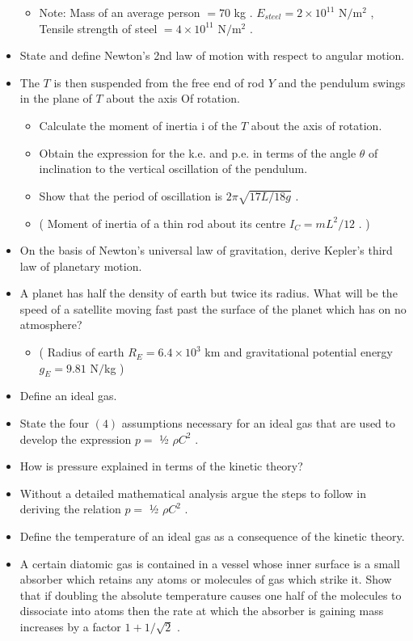 \documentclass{article}
\begin{document}
\begin{itemize}
\begin{itemize}
\item Note: Mass of an average person $ =70$ kg . $ E_{steel}=2 \times 10^{11}$ N$/$m$^{2}$ , Tensile strength of steel $ =4 \times 10^{11}$ N$/$m$^{2}$ .
\end{itemize}
\item State and define Newton’s 2nd law of motion with respect to angular motion. 
\item The $ T$ is then suspended from the free end of rod $ Y$ and the pendulum swings in the plane of $ T$ about the axis Of rotation.
 \begin{itemize}
\item Calculate the moment of inertia i of the $ T$ about the axis of rotation. 
\item Obtain the expression for the k.e. and p.e. in terms of the angle $ \theta $ of inclination to the vertical oscillation of the pendulum. 
\item Show that the period of oscillation is $ 2\pi\sqrt{17L/18g}$ . 
\item ( Moment of inertia of a thin rod about its centre $ I_{C}=mL^{2}/12$ . )
\end{itemize}
\item On the basis of Newton’s universal law of gravitation, derive Kepler’s third law of planetary motion. 
\item A planet has half the density of earth but twice its radius. What will be the speed of a satellite moving fast past the surface of the planet which has on no atmosphere?
 \begin{itemize}
\item ( Radius of earth $ R_{E}=6.4 \times 10^{3}$ km and gravitational potential energy $ g_{E}=9.81$ N$/$kg )
\end{itemize}
\item Define an ideal gas.
\item State the four $ (4)$ assumptions necessary for an ideal gas that are used to develop the expression $ p=$ ½ $ \rho C^{2}$ .
\item How is pressure explained in terms of the kinetic theory? 
\item Without a detailed mathematical analysis argue the steps to follow in deriving the relation $ p=$ ½ $ \rho C^{2}$ .
\item Define the temperature of an ideal gas as a consequence of the kinetic theory.
\item A certain diatomic gas is contained in a vessel whose inner surface is a small absorber which retains any atoms or molecules of gas which strike it.  Show that if doubling the absolute temperature causes one half of the molecules to dissociate into atoms then the rate at which the absorber is gaining mass increases by a factor $ 1+1/\sqrt{2}$ .

\end{itemize}
\end{document}
